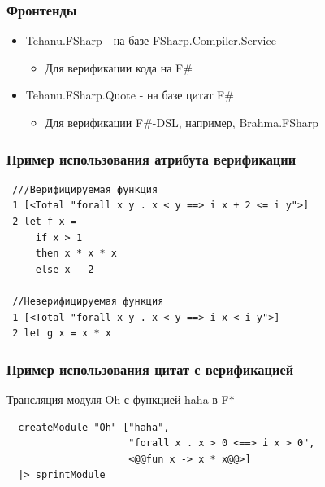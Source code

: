 \documentclass{beamer}
\def \fstar {F$\ast$}
\def \fsharp {F$\#$}
\begin{document}

\begin{frame}[fragile]
  \transwipe[direction=90]
  \frametitle{Фронтенды}
  \begin{itemize}
    \item Tehanu.FSharp - на базе FSharp.Compiler.Service
    \begin{itemize}
      \item Для верификации кода на \fsharp
    \end{itemize}
    \item Tehanu.FSharp.Quote - на базе цитат \fsharp
    \begin{itemize}
      \item Для верификации \fsharp-DSL, например, Brahma.FSharp
    \end{itemize}
  \end{itemize}
\end{frame}

\begin{frame}[fragile]
  \transwipe[direction=90]
  \frametitle{Пример использования атрибута верификации}
  \begin{verbatim}
 ///Верифицируемая функция
 1 [<Total "forall x y . x < y ==> i x + 2 <= i y">]
 2 let f x =
     if x > 1
     then x * x * x
     else x - 2 
 
 //Неверифицируемая функция
 1 [<Total "forall x y . x < y ==> i x < i y">]
 2 let g x = x * x
  \end{verbatim}
\end{frame}

\begin{frame}[fragile]
  \frametitle{Пример использования цитат с верификацией}
  \textbf{} Трансляция модуля Oh с функцией haha в \fstar
  \begin{verbatim}
  createModule "Oh" ["haha",
                     "forall x . x > 0 <==> i x > 0",
                     <@@fun x -> x * x@@>]
  |> sprintModule
  \end{verbatim}
\end{frame}

\end{document}
